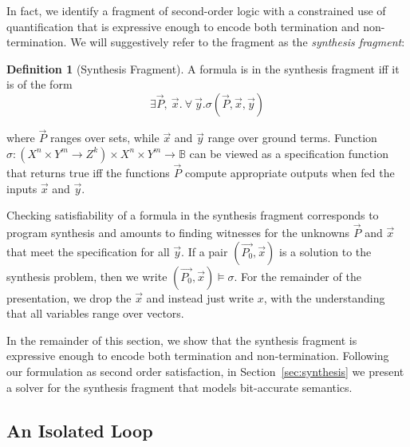 \documentclass[preprint]{sigplanconf}
\theoremstyle{definition}
\newtheorem{definition}[theorem]{Definition}
\begin{document}
In fact, we identify a fragment of second-order logic with a constrained use of quantification that is expressive enough to encode both termination and non-termination.
We will suggestively refer to the fragment as the \emph{synthesis fragment}:


\begin{definition}[Synthesis Fragment]
 A formula is in the synthesis fragment iff it is of the form
 \[
  \exists \vec{P},~ \vec{x} . ~\forall~ \vec{y} . \sigma(\vec{P}, \vec{x}, \vec{y})
 \]

where $\vec{P}$ ranges over sets, while $\vec{x}$ and $\vec{y}$ range over ground terms.
Function $\sigma: (X^n \times Y^m \to Z^k) \times X^n \times Y^m  \to \mathbb{B}$ can be viewed as a specification function
that  returns true iff the functions $\vec{P}$ compute appropriate outputs
when fed the inputs $\vec{x}$ and $\vec{y}$.  
\end{definition}

Checking satisfiability of a formula in the synthesis fragment corresponds to program synthesis and
amounts to finding witnesses for the unknowns $\vec{P}$ and $\vec{x}$ that meet the specification
for all $\vec{y}$. 
If a pair $(\vec{P_0}, \vec{x})$ is a solution to the synthesis problem, then we write $(\vec{P_0}, \vec{x}) \models \sigma$.
For the remainder of the presentation, we drop the $\vec{x}$ and instead just write $x$, with the understanding
that all variables range over vectors.

In the remainder of this section, we show that the synthesis fragment 
is expressive enough to encode both termination and non-termination. %
Following our formulation as second order satisfaction, %
in Section~\ref{sec:synthesis} we present a solver for the synthesis fragment that models bit-accurate semantics. 


\subsection{An Isolated Loop}
\end{document}
